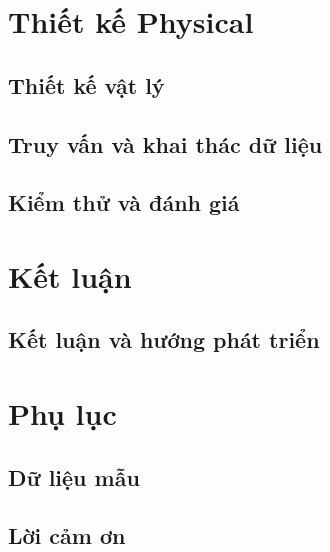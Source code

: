 \documentclass[letterpaper,11pt,leqno,openany]{book}
\newcommand{\bib}{book.bib}
\begin{document}
\part{Thiết kế Physical}\label{p:physical}

\chapter{Thiết kế vật lý}\label{c:physical}


\chapter{Truy vấn và khai thác dữ liệu}\label{c:queries}


\chapter{Kiểm thử và đánh giá}\label{c:testing}


\part{Kết luận}\label{p:conclusion}

\chapter{Kết luận và hướng phát triển}\label{c:conclusion}


\appendix

\part{Phụ lục}\label{p:appendix}

\chapter{Dữ liệu mẫu}\label{a:data}


\backmatter
\nocite{*}


\chapter{Lời cảm ơn}


\printindex
\end{document}
